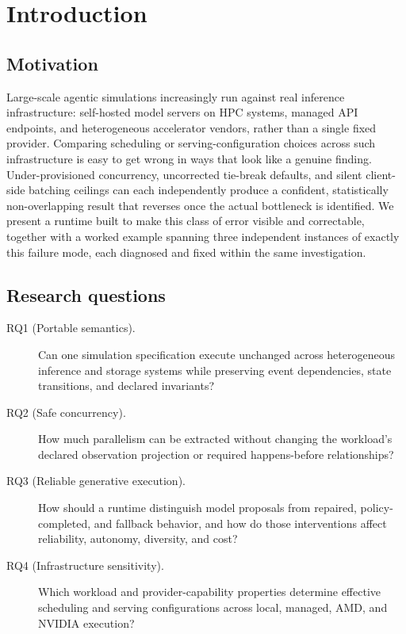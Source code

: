 \section{Introduction}
\label{sec:intro}

\subsection{Motivation}
\label{sec:motivation}

Large-scale agentic simulations increasingly run against real inference infrastructure: self-hosted model servers on HPC systems, managed API endpoints, and heterogeneous accelerator vendors, rather than a single fixed provider. Comparing scheduling or serving-configuration choices across such infrastructure is easy to get wrong in ways that look like a genuine finding. Under-provisioned concurrency, uncorrected tie-break defaults, and silent client-side batching ceilings can each independently produce a confident, statistically non-overlapping result that reverses once the actual bottleneck is identified. We present a runtime built to make this class of error visible and correctable, together with a worked example spanning three independent instances of exactly this failure mode, each diagnosed and fixed within the same investigation.

\subsection{Research questions}
\label{sec:rq}

\begin{description}
  \item[RQ1 (Portable semantics).] Can one simulation specification execute unchanged across heterogeneous inference and storage systems while preserving event dependencies, state transitions, and declared invariants?
  \item[RQ2 (Safe concurrency).] How much parallelism can be extracted without changing the workload's declared observation projection or required happens-before relationships?
  \item[RQ3 (Reliable generative execution).] How should a runtime distinguish model proposals from repaired, policy-completed, and fallback behavior, and how do those interventions affect reliability, autonomy, diversity, and cost?
  \item[RQ4 (Infrastructure sensitivity).] Which workload and provider-capability properties determine effective scheduling and serving configurations across local, managed, AMD, and NVIDIA execution?
\end{description}

